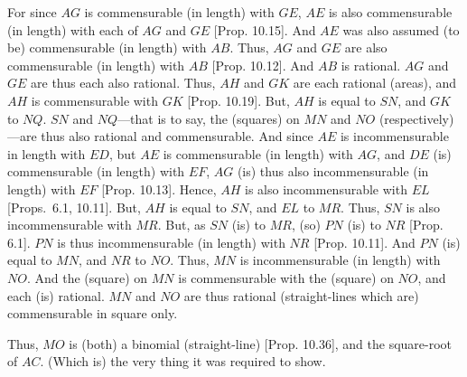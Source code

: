 \begin{Parallel}{}{}
{For since $AG$ is commensurable (in length) with $GE$, $AE$ is also commensurable (in length)
with each of $AG$ and $GE$ [Prop. 10.15]. 
And $AE$ was also assumed (to be) commensurable (in length) with $AB$.  Thus,
$AG$ and $GE$ are also commensurable (in length) with $AB$
[Prop. 10.12]. And $AB$ is rational. $AG$
and $GE$ are thus each also  rational. Thus, $AH$ and $GK$ are each
rational (areas), and $AH$ is commensurable with $GK$ [Prop. 10.19]. But, $AH$ is equal to $SN$,
and $GK$ to $NQ$. $SN$ and $NQ$---that is to say, the (squares)
on $MN$ and $NO$ (respectively)---are thus also rational and commensurable. And since $AE$ is incommensurable in length with $ED$,
but $AE$ is commensurable (in length) with $AG$, and $DE$ (is) commensurable (in length)
with $EF$, $AG$ (is) thus also incommensurable (in length) with $EF$
[Prop. 10.13]. Hence, $AH$ is also incommensurable with $EL$ [Props.~6.1, 10.11]. But, $AH$ is equal to $SN$, and $EL$
to $MR$. Thus, $SN$ is also incommensurable with $MR$. But, as
$SN$ (is) to $MR$, (so) $PN$ (is) to $NR$ [Prop. 6.1].  $PN$ is thus incommensurable (in length) with $NR$ [Prop. 10.11]. And $PN$ (is) equal to $MN$, and $NR$ to
$NO$. Thus, $MN$ is incommensurable (in length) with $NO$. And the (square)
on $MN$ is commensurable with the (square) on $NO$, and each (is)
rational.  $MN$ and $NO$ are thus rational (straight-lines which are)
commensurable in square only.

Thus, $MO$ is (both) a binomial (straight-line) [Prop. 10.36], and the square-root of $AC$.
(Which is) the very thing it was required to show.}
\end{Parallel}



